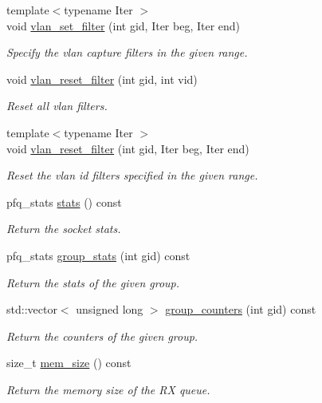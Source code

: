 \begin{DoxyCompactItemize}
{\footnotesize template$<$typename Iter $>$ }\\void \hyperlink{classnet_1_1pfq_a92c3d3dd0a6a194dd0c6f3f8af3b8ffa}{vlan\+\_\+set\+\_\+filter} (int gid, Iter beg, Iter end)
\begin{DoxyCompactList}\small\item\em Specify the vlan capture filters in the given range. \end{DoxyCompactList}\item 
void \hyperlink{classnet_1_1pfq_a97110c0362a20cabdb49e4d2ac5d935d}{vlan\+\_\+reset\+\_\+filter} (int gid, int vid)
\begin{DoxyCompactList}\small\item\em Reset all vlan filters. \end{DoxyCompactList}\item 
{\footnotesize template$<$typename Iter $>$ }\\void \hyperlink{classnet_1_1pfq_ab889e0293649d06ecdc626038fb7af44}{vlan\+\_\+reset\+\_\+filter} (int gid, Iter beg, Iter end)
\begin{DoxyCompactList}\small\item\em Reset the vlan id filters specified in the given range. \end{DoxyCompactList}\item 
pfq\+\_\+stats \hyperlink{classnet_1_1pfq_a4eaca8322c9f3926df19dda2a097fa3c}{stats} () const 
\begin{DoxyCompactList}\small\item\em Return the socket stats. \end{DoxyCompactList}\item 
pfq\+\_\+stats \hyperlink{classnet_1_1pfq_a37f5f1afcffcb6000cce15282fcf8d4b}{group\+\_\+stats} (int gid) const 
\begin{DoxyCompactList}\small\item\em Return the stats of the given group. \end{DoxyCompactList}\item 
std\+::vector$<$ unsigned long $>$ \hyperlink{classnet_1_1pfq_a6bf8419e9e400e8a7ffc9d3a6978cfd8}{group\+\_\+counters} (int gid) const 
\begin{DoxyCompactList}\small\item\em Return the counters of the given group. \end{DoxyCompactList}\item 
size\+\_\+t \hyperlink{classnet_1_1pfq_ac25e20f2b2bfd72ef399444337b76459}{mem\+\_\+size} () const 
\begin{DoxyCompactList}\small\item\em Return the memory size of the R\+X queue. \end{DoxyCompactList}\item 

\end{DoxyCompactItemize}
